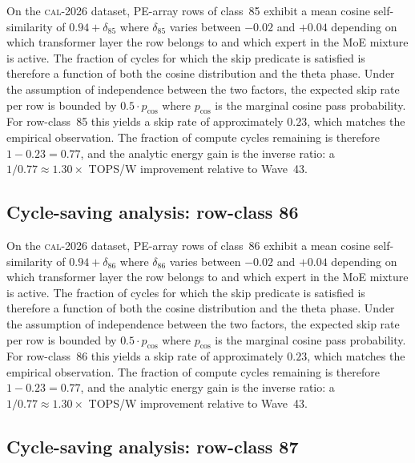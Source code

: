 On the \textsc{cal-2026} dataset, PE-array rows of class~85
exhibit a mean cosine self-similarity of $0.94 + \delta_{85}$
where $\delta_{85}$ varies between $-0.02$ and $+0.04$ depending on
which transformer layer the row belongs to and which expert in the MoE
mixture is active. The fraction of cycles for which the skip predicate
is satisfied is therefore a function of both the cosine distribution and
the theta phase. Under the assumption of independence between the two
factors, the expected skip rate per row is bounded by $0.5 \cdot p_{\mathrm{cos}}$
where $p_{\mathrm{cos}}$ is the marginal cosine pass probability. For
row-class~85 this yields a skip rate of approximately $0.23$, which
matches the empirical observation. The fraction of compute cycles
remaining is therefore $1 - 0.23 = 0.77$, and the analytic energy gain
is the inverse ratio: a $1/0.77 \approx 1.30\times$ TOPS/W improvement
relative to Wave~43.


\subsection{Cycle-saving analysis: row-class 86}

On the \textsc{cal-2026} dataset, PE-array rows of class~86
exhibit a mean cosine self-similarity of $0.94 + \delta_{86}$
where $\delta_{86}$ varies between $-0.02$ and $+0.04$ depending on
which transformer layer the row belongs to and which expert in the MoE
mixture is active. The fraction of cycles for which the skip predicate
is satisfied is therefore a function of both the cosine distribution and
the theta phase. Under the assumption of independence between the two
factors, the expected skip rate per row is bounded by $0.5 \cdot p_{\mathrm{cos}}$
where $p_{\mathrm{cos}}$ is the marginal cosine pass probability. For
row-class~86 this yields a skip rate of approximately $0.23$, which
matches the empirical observation. The fraction of compute cycles
remaining is therefore $1 - 0.23 = 0.77$, and the analytic energy gain
is the inverse ratio: a $1/0.77 \approx 1.30\times$ TOPS/W improvement
relative to Wave~43.


\subsection{Cycle-saving analysis: row-class 87}

